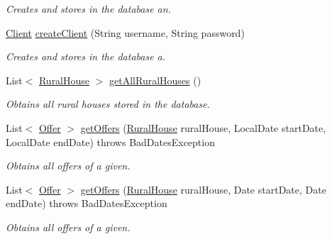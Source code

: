\begin{DoxyCompactItemize}
\begin{DoxyCompactList}\small\item\em Creates and stores in the database an. \end{DoxyCompactList}\item 
\mbox{\hyperlink{classcom_1_1ruralhousejsf_1_1domain_1_1_client}{Client}} \mbox{\hyperlink{interfacecom_1_1ruralhousejsf_1_1data_access_1_1_hibernate_data_access_interface_a4671ad8ff75ef8a9195974dbdcd95e7f}{create\+Client}} (String username, String password)
\begin{DoxyCompactList}\small\item\em Creates and stores in the database a. \end{DoxyCompactList}\item 
List$<$ \mbox{\hyperlink{classcom_1_1ruralhousejsf_1_1domain_1_1_rural_house}{Rural\+House}} $>$ \mbox{\hyperlink{interfacecom_1_1ruralhousejsf_1_1data_access_1_1_hibernate_data_access_interface_a1cdfce6d8d91e481887b364000fbf6d0}{get\+All\+Rural\+Houses}} ()
\begin{DoxyCompactList}\small\item\em Obtains all rural houses stored in the database. \end{DoxyCompactList}\item 
List$<$ \mbox{\hyperlink{classcom_1_1ruralhousejsf_1_1domain_1_1_offer}{Offer}} $>$ \mbox{\hyperlink{interfacecom_1_1ruralhousejsf_1_1data_access_1_1_hibernate_data_access_interface_a731ab9e6ef26732d453046c9630c677b}{get\+Offers}} (\mbox{\hyperlink{classcom_1_1ruralhousejsf_1_1domain_1_1_rural_house}{Rural\+House}} rural\+House, Local\+Date start\+Date, Local\+Date end\+Date)  throws Bad\+Dates\+Exception
\begin{DoxyCompactList}\small\item\em Obtains all offers of a given. \end{DoxyCompactList}\item 
List$<$ \mbox{\hyperlink{classcom_1_1ruralhousejsf_1_1domain_1_1_offer}{Offer}} $>$ \mbox{\hyperlink{interfacecom_1_1ruralhousejsf_1_1data_access_1_1_hibernate_data_access_interface_a2cc9a4e0968b6fde1773f03f3d1ea33c}{get\+Offers}} (\mbox{\hyperlink{classcom_1_1ruralhousejsf_1_1domain_1_1_rural_house}{Rural\+House}} rural\+House, Date start\+Date, Date end\+Date)  throws Bad\+Dates\+Exception
\begin{DoxyCompactList}\small\item\em Obtains all offers of a given. \end{DoxyCompactList}\item 

\end{DoxyCompactItemize}
